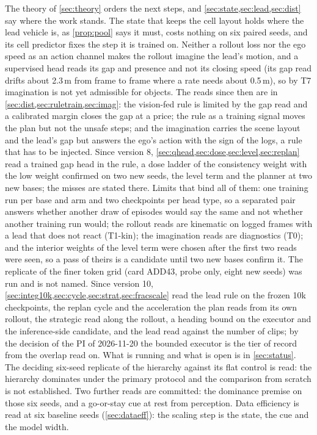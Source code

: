 \documentclass[10pt,twocolumn]{article}
\theoremstyle{remark}
\begin{document}
The theory of \cref{sec:theory} orders the next steps, and \cref{sec:state,sec:lead,sec:dist} say where the work stands. The state that keeps the cell layout holds where the lead vehicle is, as \cref{prop:pool} says it must, costs nothing on six paired seeds, and its cell predictor fixes the step it is trained on. Neither a rollout loss nor the ego speed as an action channel makes the rollout imagine the lead's motion, and a supervised head reads its gap and presence and not its closing speed (its gap read drifts about 2.3\,m from frame to frame where a rate needs about 0.5\,m), so by T7 imagination is not yet admissible for objects. The reads since then are in \cref{sec:dist,sec:ruletrain,sec:imag}: the vision-fed rule is limited by the gap read and a calibrated margin closes the gap at a price; the rule as a training signal moves the plan but not the unsafe steps; and the imagination carries the scene layout and the lead's gap but answers the ego's action with the sign of the logs, a rule that has to be injected. Since version 8, \cref{sec:qhead,sec:dose,sec:level,sec:replan} read a trained gap head in the rule, a dose ladder of the consistency weight with the low weight confirmed on two new seeds, the level term and the planner at two new bases; the misses are stated there. Limits that bind all of them: one training run per base and arm and two checkpoints per head type, so a separated pair answers whether another draw of episodes would say the same and not whether another training run would; the rollout reads are kinematic on logged frames with a lead that does not react (T1-kin); the imagination reads are diagnostics (T0); and the interior weights of the level term were chosen after the first two reads were seen, so a pass of theirs is a candidate until two new bases confirm it. The replicate of the finer token grid (card ADD43, probe only, eight new seeds) was run and is not named. Since version 10, \cref{sec:integ10k,sec:cycle,sec:strat,sec:fracscale} read the lead rule on the frozen 10k checkpoints, the replan cycle and the acceleration the plan reads from its own rollout, the strategic read along the rollout, a heading bound on the executor and the inference-side candidate, and the lead read against the number of clips; by the decision of the PI of 2026-11-20 the bounded executor is the tier of record from the overlap read on. What is running and what is open is in \cref{sec:status}. The deciding six-seed replicate of the hierarchy against its flat control is read: the hierarchy dominates under the primary
protocol and the comparison from scratch is not established. Two further reads are committed: the
dominance premise on those six seeds, and a go-or-stay cue at rest from perception. Data efficiency is read at six baseline seeds (\cref{sec:dataeff}): the scaling step is the state, the cue and the model width.
\end{document}
